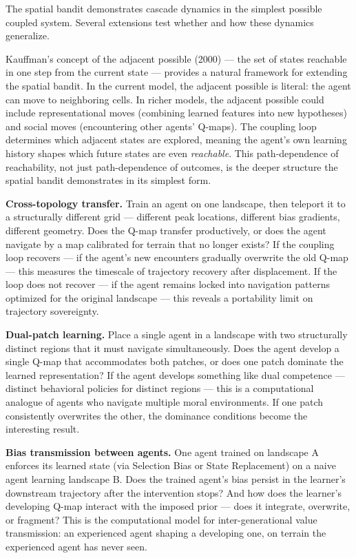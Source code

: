 \documentclass[
]{article}
\begin{document}
The spatial bandit demonstrates cascade dynamics in the simplest
possible coupled system. Several extensions test whether and how these
dynamics generalize.

Kauffman's concept of the adjacent possible (2000) --- the set of states
reachable in one step from the current state --- provides a natural
framework for extending the spatial bandit. In the current model, the
adjacent possible is literal: the agent can move to neighboring cells.
In richer models, the adjacent possible could include representational
moves (combining learned features into new hypotheses) and social moves
(encountering other agents' Q-maps). The coupling loop determines which
adjacent states are explored, meaning the agent's own learning history
shapes which future states are even \emph{reachable}. This
path-dependence of reachability, not just path-dependence of outcomes,
is the deeper structure the spatial bandit demonstrates in its simplest
form.

\textbf{Cross-topology transfer.} Train an agent on one landscape, then
teleport it to a structurally different grid --- different peak
locations, different bias gradients, different geometry. Does the Q-map
transfer productively, or does the agent navigate by a map calibrated
for terrain that no longer exists? If the coupling loop recovers --- if
the agent's new encounters gradually overwrite the old Q-map --- this
measures the timescale of trajectory recovery after displacement. If the
loop does not recover --- if the agent remains locked into navigation
patterns optimized for the original landscape --- this reveals a
portability limit on trajectory sovereignty.

\textbf{Dual-patch learning.} Place a single agent in a landscape with
two structurally distinct regions that it must navigate simultaneously.
Does the agent develop a single Q-map that accommodates both patches, or
does one patch dominate the learned representation? If the agent
develops something like dual competence --- distinct behavioral policies
for distinct regions --- this is a computational analogue of agents who
navigate multiple moral environments. If one patch consistently
overwrites the other, the dominance conditions become the interesting
result.

\textbf{Bias transmission between agents.} One agent trained on
landscape A enforces its learned state (via Selection Bias or State
Replacement) on a naive agent learning landscape B. Does the trained
agent's bias persist in the learner's downstream trajectory after the
intervention stops? And how does the learner's developing Q-map interact
with the imposed prior --- does it integrate, overwrite, or fragment?
This is the computational model for inter-generational value
transmission: an experienced agent shaping a developing one, on terrain
the experienced agent has never seen.
\end{document}
